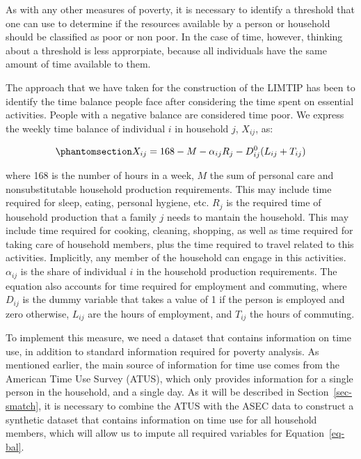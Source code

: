 \documentclass[
  11pt,
]{article}
\begin{document}
As with any other measures of poverty, it is necessary to identify a
threshold that one can use to determine if the resources available by a
person or household should be classified as poor or non poor. In the
case of time, however, thinking about a threshold is less approrpiate,
because all individuals have the same amount of time available to them.

The approach that we have taken for the construction of the LIMTIP has
been to identify the time balance people face after considering the time
spent on essential activities. People with a negative balance are
considered time poor. We express the weekly time balance of individual
\(i\) in household \(j\), \(X_{ij}\), as:

\begin{equation}\phantomsection\label{eq-bal}{X_{ij} = 168 - M - \alpha_{ij}R_j-D_{ij}^0(L_{ij}+T_{ij})
}\end{equation}

where 168 is the number of hours in a week, \(M\) the sum of personal
care and nonsubstitutable household production requirements. This may
include time required for sleep, eating, personal hygiene, etc. \(R_j\)
is the required time of household production that a family \(j\) needs
to mantain the household. This may include time required for cooking,
cleaning, shopping, as well as time required for taking care of
household members, plus the time required to travel related to this
activities. Implicitly, any member of the household can engage in this
activities. \(\alpha_{ij}\) is the share of individual \(i\) in the
household production requirements. The equation also accounts for time
required for employment and commuting, where \(D_{ij}\) is the dummy
variable that takes a value of 1 if the person is employed and zero
otherwise, \(L_{ij}\) are the hours of employment, and \(T_{ij}\) the
hours of commuting.

To implement this measure, we need a dataset that contains information
on time use, in addition to standard information required for poverty
analysis. As mentioned earlier, the main source of information for time
use comes from the American Time Use Survey (ATUS), which only provides
information for a single person in the household, and a single day. As
it will be described in Section~\ref{sec-smatch}, it is necessary to
combine the ATUS with the ASEC data to construct a synthetic dataset
that contains information on time use for all household members, which
will allow us to impute all required variables for
Equation~\ref{eq-bal}.
\end{document}
